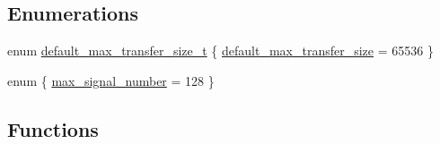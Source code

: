 \subsection*{Enumerations}
\begin{DoxyCompactItemize}
\item 
enum \hyperlink{namespaceasio_1_1detail_a3ef4d3687bc8336cee7eb1bcc065067d}{default\+\_\+max\+\_\+transfer\+\_\+size\+\_\+t} \{ \hyperlink{namespaceasio_1_1detail_a3ef4d3687bc8336cee7eb1bcc065067da5c70349aa524435ece31162042960355}{default\+\_\+max\+\_\+transfer\+\_\+size} = 65536
 \}
\item 
enum \{ \hyperlink{namespaceasio_1_1detail_a8ce9598d4b88a6eaca79522f8a4572f5a74aea376792d8d6e668d48a0acc144e2}{max\+\_\+signal\+\_\+number} = 128
 \}
\end{DoxyCompactItemize}
\subsection*{Functions}
